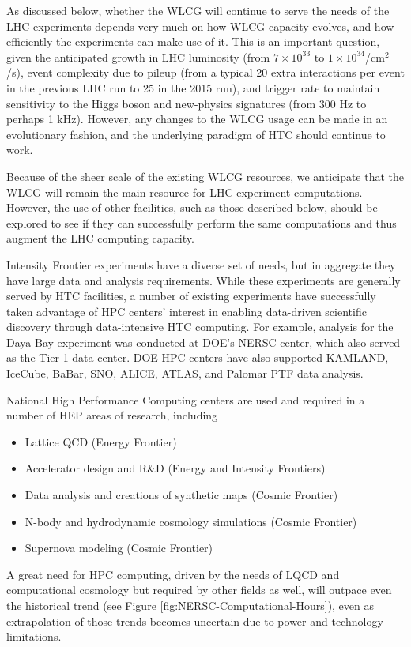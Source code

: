 As discussed below, whether the WLCG will continue to serve the needs of the LHC experiments depends very much on how WLCG capacity evolves, and how efficiently the experiments can make use of it.  This is an important question, given the anticipated growth in LHC luminosity (from $7 \times 10^{33}$ to $1 \times 10^{34}$/cm$^2$/s), event complexity due to pileup (from a typical 20 extra interactions per event in the previous LHC run to 25 in the 2015 run), and trigger rate to maintain sensitivity to the Higgs boson and new-physics signatures (from 300 Hz to perhaps 1 kHz).  However, any changes to the WLCG usage can be made in an evolutionary fashion, and the underlying paradigm of HTC should continue to work.

Because of the sheer scale of the existing WLCG resources, we anticipate that the WLCG will remain the main resource for LHC experiment computations.  However, the use of other facilities, such as those described below, should be explored to see if they can successfully perform the same computations and thus augment the LHC computing capacity.

Intensity Frontier experiments have a diverse set of needs, but in aggregate they have large data and analysis requirements. While these experiments are generally served by HTC facilities, a number of existing experiments have successfully taken advantage of HPC centers' interest in enabling data-driven scientific discovery through data-intensive HTC computing.  For example, analysis for the Daya Bay experiment was conducted at DOE's NERSC center, which also served as the Tier 1 data center.  DOE HPC centers have also supported KAMLAND, IceCube, BaBar, SNO, ALICE, ATLAS, and Palomar PTF data analysis.

National High Performance Computing centers are used and required in a number of HEP areas of research, including

\begin{itemize}
\item Lattice QCD (Energy Frontier)
\item Accelerator design and R\&D (Energy and Intensity Frontiers)
\item Data analysis and creations of synthetic maps (Cosmic Frontier)
\item N-body and hydrodynamic cosmology simulations (Cosmic Frontier)
\item Supernova modeling (Cosmic Frontier)
\end{itemize}

A great need for HPC computing, driven by the needs of LQCD and computational cosmology but required by other fields as well, will outpace even the historical trend (see Figure \ref{fig:NERSC-Computational-Hours}), even as extrapolation of those trends becomes uncertain due to power and technology limitations.

